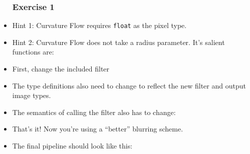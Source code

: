 \begin{frame}
\begin{itemize}
\frametitle{Exercise 1}
\item Hint 1: Curvature Flow requires {\tt float} as the pixel
  type.
\pause
\item Hint 2: Curvature Flow does not take a radius parameter. It's
  salient functions are:
\end{itemize}
\end{frame}

\begin{frame}
\begin{itemize}
\frametitle{Exercise 1 (Answer)}
\item First, change the included filter
\pause
\item The type definitions also need to change to reflect the new
  filter and output image types.
\end{itemize}
\end{frame}

\begin{frame}
\begin{itemize}
\frametitle{Exercise 1 (Answer)}
\item The semantics of calling the filter also has to change:
\pause
\item That's it! Now you're using a ``better'' blurring scheme.
\end{itemize}
\end{frame}

\begin{frame}
\begin{itemize}
\frametitle{Exercise 1 (Answer)}
\item The final pipeline should look like this:
\end{itemize}
\end{frame}